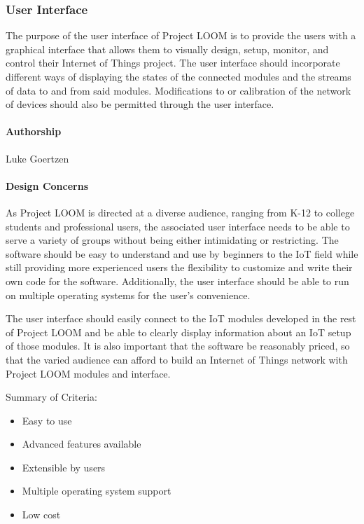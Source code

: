 \documentclass[onecolumn, draftclsnofoot,10pt, compsoc]{IEEEtran}
\begin{document}
\subsubsection{User Interface}
The purpose of the user interface of Project LOOM is to provide the users with a graphical interface that allows them to visually design, setup, monitor, and control their Internet of Things project. The user interface should incorporate different ways of displaying the states of the connected modules and the streams of data to and from said modules. Modifications to or calibration of the network of devices should also be permitted through the user interface.

\paragraph{Authorship}
Luke Goertzen

\paragraph{Design Concerns}
As Project LOOM is directed at a diverse audience, ranging from K-12 to college students and professional users, the associated user interface needs to be able to serve a variety of groups without being either intimidating or restricting. The software should be easy to understand and use by beginners to the IoT field while still providing more experienced users the flexibility to customize and write their own code for the software. Additionally, the user interface should be able to run on multiple operating systems for the user's convenience.

The user interface should easily connect to the IoT modules developed in the rest of Project LOOM and be able to clearly display information about an IoT setup of those modules. It is also important that the software be reasonably priced, so that the varied audience can afford to build an Internet of Things network with Project LOOM modules and interface.

Summary of Criteria:
\begin{itemize}[noitemsep,topsep=-10pt]
    \item Easy to use
    \item Advanced features available
    \item Extensible by users
    \item Multiple operating system support
    \item Low cost
\end{itemize}
\end{document}

